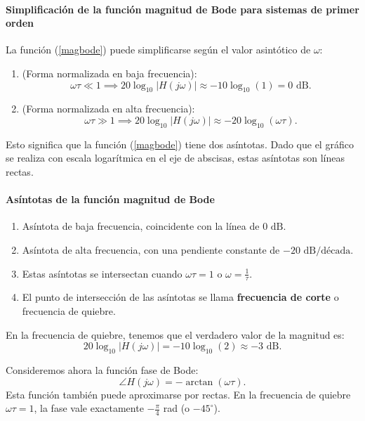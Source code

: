 \paragraph{Simplificaci\'{o}n de la funci\'{o}n magnitud de Bode para sistemas de primer orden}
La funci\'{o}n (\ref{magbode}) puede simplificarse seg\'{u}n el valor asint\'{o}tico de $\omega$:
\begin{enumerate}
	\item (Forma normalizada en baja frecuencia):
	\begin{equation}
		\omega\tau \ll 1 \implies 20\log_{10} |H(j\omega)| \approx -10\log_{10}(1) = 0 \text{ dB}.
	\end{equation}
	
	\item (Forma normalizada en alta frecuencia):
	\begin{equation}
		\omega\tau \gg 1 \implies 20\log_{10} |H(j\omega)| \approx -20\log_{10}(\omega\tau).
	\end{equation}
\end{enumerate}
Esto significa que la funci\'{o}n (\ref{magbode}) tiene dos as\'{i}ntotas. Dado que el gr\'{a}fico se realiza con escala logar\'{i}tmica en el eje de abscisas, estas as\'{i}ntotas son líneas rectas.

\paragraph{As\'{i}ntotas de la funci\'{o}n magnitud de Bode}
\begin{enumerate}
	\item As\'{i}ntota de baja frecuencia, coincidente con la l\'{i}nea de $0 \text{ dB}$.
	\item As\'{i}ntota de alta frecuencia, con una pendiente constante de $-20 \text{ dB/d\'{e}cada}$.
	\item Estas as\'{i}ntotas se intersectan cuando $\omega\tau = 1$ o $\omega = \frac{1}{\tau}$.
	\item El punto de intersecci\'{o}n de las as\'{i}ntotas se llama \textbf{frecuencia de corte} o frecuencia de quiebre.
\end{enumerate}

En la frecuencia de quiebre, tenemos que el verdadero valor de la magnitud es:
\begin{equation}
	20\log_{10} |H(j\omega)| = -10\log_{10}(2) \approx -3 \text{ dB}.
\end{equation}

Consideremos ahora la funci\'{o}n fase de Bode:
\begin{equation}
	\angle H(j\omega) = -\arctan(\omega\tau). \label{faseBode}
\end{equation}
Esta funci\'{o}n tambi\'{e}n puede aproximarse por rectas. En la frecuencia de quiebre $\omega\tau = 1$, la fase vale exactamente $-\frac{\pi}{4}$ rad (o $-45^\circ$).


